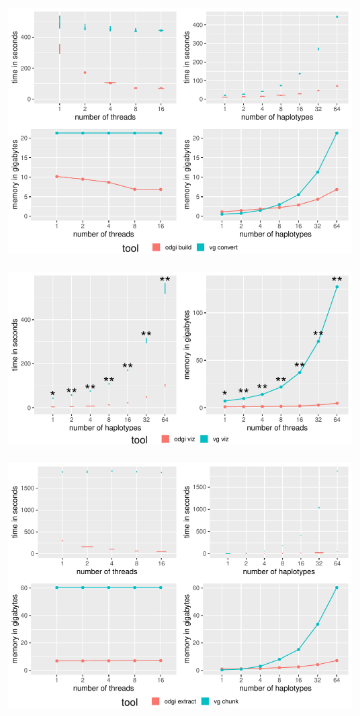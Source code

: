 \begin{figure}[]
	\begin{subfigure}{\linewidth}
		\caption{}
		\centering
		\includegraphics[width=1.0\linewidth, trim=0cm 1.25cm 0cm 0cm]{fig/performance/build_eval.pdf}
		\label{fig:eval-build}
	\end{subfigure}
	\begin{subfigure}{1\linewidth}
		\caption{}
		\centering
		\includegraphics[width=\linewidth, trim=0cm 1.25cm 0cm 0cm]{fig/performance/viz_eval.pdf}
		\label{fig:eval-viz}
	\end{subfigure}
	\begin{subfigure}{\linewidth}
		\caption{}
		\centering
		\includegraphics[width=\linewidth, trim=0cm 1.25cm 0cm 0cm]{fig/performance/extract_eval.pdf}

\end{subfigure}
\end{figure}
